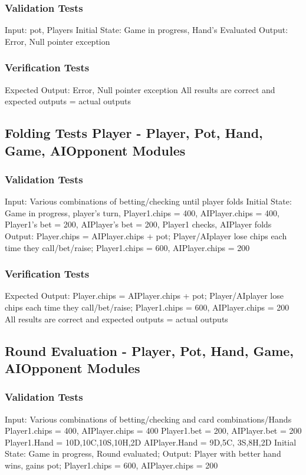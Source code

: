 \documentclass[11pt]{article}
\begin{document}
\subsubsection{Validation Tests}
Input: pot, Players
Initial State: Game in progress, Hand’s Evaluated
Output: Error, Null pointer exception

\subsubsection{Verification Tests}
Expected Output: Error, Null pointer exception
All results are correct and expected outputs = actual outputs

\subsection{Folding Tests Player - Player, Pot, Hand, Game, AIOpponent Modules}

\subsubsection{Validation Tests}
Input: Various combinations of betting/checking until player folds 
Initial State: Game in progress, player’s turn,
Player1.chips = 400, AIPlayer.chips = 400, Player1's bet = 200, AIPlayer's bet = 200,
Player1 checks, AIPlayer folds
Output: Player.chips = AIPlayer.chips + pot; Player/AIplayer lose chips each time they call/bet/raise; Player1.chips = 600, AIPlayer.chips = 200

\subsubsection{Verification Tests}
Expected Output: Player.chips = AIPlayer.chips + pot; Player/AIplayer lose chips each time they call/bet/raise; Player1.chips = 600, AIPlayer.chips = 200
All results are correct and expected outputs = actual outputs

\subsection{Round Evaluation - Player, Pot, Hand, Game, AIOpponent Modules}

\subsubsection{Validation Tests}
Input: Various combinations of betting/checking and card combinations/Hands
Player1.chips = 400, AIPlayer.chips = 400 Player1.bet = 200, AIPlayer.bet = 200
Player1.Hand = 10D,10C,10S,10H,2D AIPlayer.Hand = 9D,5C, 3S,8H,2D
Initial State: Game in progress, Round evaluated;
Output: Player with better hand wins, gains pot; Player1.chips = 600, AIPlayer.chips = 200
\end{document}
